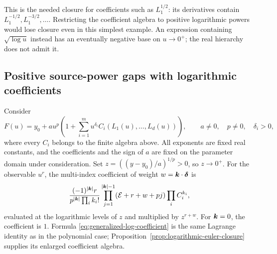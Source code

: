 This is the needed closure for coefficients such as $L_1^{1/2}$:
its derivatives contain $L_1^{-1/2},L_1^{-3/2},\ldots$.
Restricting the coefficient algebra to positive logarithmic powers would
lose closure even in this simplest example. An expression containing
$\sqrt{\log u}$ instead has an eventually negative base on $u\to0^+$;
the real hierarchy does not admit it.

\subsection{Positive source-power gaps with logarithmic coefficients}

Consider
\begin{equation}
 F(u)=y_0+a u^p\left(1+\sum_{i=1}^m
 u^{\delta_i}C_i(L_1(u),\ldots,L_d(u))\right),
 \qquad a\ne0,\quad p\ne0,\quad \delta_i>0,
 \label{eq:generalized-log-forward}
\end{equation}
where every $C_i$ belongs to the finite algebra above. All exponents are
fixed real constants, and the coefficients and the sign of $a$ are fixed
on the parameter domain under consideration.
Set $z=((y-y_0)/a)^{1/p}>0$, so $z\to0^+$. For the observable $u^r$, the
multi-index coefficient of weight $w=\boldsymbol k\cdot\boldsymbol\delta$ is
\begin{equation}
 \frac{(-1)^{|\boldsymbol k|}r}{p^{|\boldsymbol k|}\prod_i k_i!}
 \prod_{j=1}^{|\boldsymbol k|-1}(\mathcal E+r+w+pj)
 \prod_i C_i^{k_i},
 \label{eq:generalized-log-coefficient}
\end{equation}
evaluated at the logarithmic levels of $z$ and multiplied by $z^{r+w}$.
For $\boldsymbol k=0$, the coefficient is $1$. Formula
\eqref{eq:generalized-log-coefficient} is the same Lagrange identity as
in the polynomial case; Proposition~\ref{prop:logarithmic-euler-closure}
supplies its enlarged coefficient algebra.

